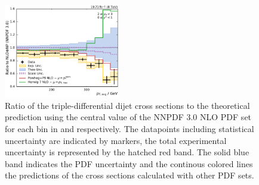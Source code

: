 \begin{figure}[htbp]
    \includegraphics[width=0.45\textwidth]{figures/measurement/ratio_to_NNPDF30+np_varcomp_yb2ys0.pdf}
    \caption[Ratio of the cross section to NNPDF 3.0 NLO]{
    Ratio of the triple-differential dijet cross sections to the theoretical
    prediction using the central value of the NNPDF 3.0 NLO PDF set for each bin in \ystar
    and \yboost respectively. The datapoints including statistical uncertainty are
    indicated by markers, the total experimental uncertainty is represented by the
    hatched red band. The solid blue band indicates the PDF uncertainty and the
    continous colored lines the predictions of the cross sections calculated with
    other PDF sets.}
    \label{fig:ratio_nnpdf30_mccomp_nlo}
\end{figure}



